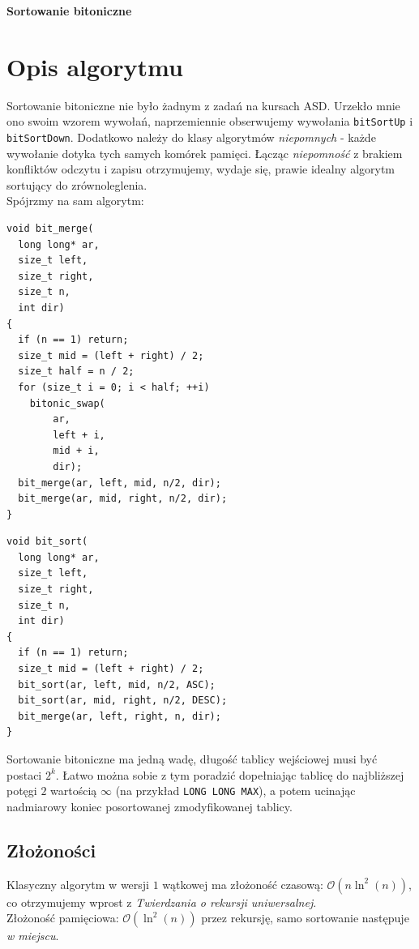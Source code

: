 \documentclass{article}
\begin{document}
\begin{center}
    {\LARGE \textbf{Sortowanie bitoniczne}} \\[1em]
\end{center}

\section*{Opis algorytmu}
Sortowanie bitoniczne nie było żadnym z zadań na kursach ASD. Urzekło mnie ono swoim wzorem wywołań, naprzemiennie obserwujemy wywołania \texttt{bitSortUp} i \texttt{bitSortDown}. Dodatkowo należy do klasy algorytmów \textit{niepomnych} - każde wywołanie dotyka tych samych komórek pamięci. Łącząc \textit{niepomność} z brakiem konfliktów odczytu i zapisu otrzymujemy, wydaje się, prawie idealny algorytm sortujący do zrównoleglenia. \\ 
Spójrzmy na sam algorytm:
\begin{multicols}{2}
\begin{verbatim}
void bit_merge(
  long long* ar,
  size_t left,
  size_t right,
  size_t n,
  int dir)
{
  if (n == 1) return;
  size_t mid = (left + right) / 2;
  size_t half = n / 2;
  for (size_t i = 0; i < half; ++i)
    bitonic_swap(
        ar,
        left + i,
        mid + i,
        dir);
  bit_merge(ar, left, mid, n/2, dir);
  bit_merge(ar, mid, right, n/2, dir);
}
\end{verbatim}
\columnbreak
\begin{verbatim}
void bit_sort(
  long long* ar,
  size_t left,
  size_t right,
  size_t n,
  int dir)
{
  if (n == 1) return;
  size_t mid = (left + right) / 2;
  bit_sort(ar, left, mid, n/2, ASC);
  bit_sort(ar, mid, right, n/2, DESC);
  bit_merge(ar, left, right, n, dir);
}
\end{verbatim}
\end{multicols}
Sortowanie bitoniczne ma jedną wadę, długość tablicy wejściowej musi być postaci $2^k$. Łatwo można sobie z tym poradzić dopełniając tablicę do najbliższej potęgi $2$ wartością $\infty$ (na przykład \texttt{LONG LONG MAX}), a potem ucinając nadmiarowy koniec posortowanej zmodyfikowanej tablicy.
\subsection*{Złożoności}
Klasyczny algorytm w wersji $1$ wątkowej ma złożoność czasową: $\mathcal{O}(n\ln^2(n))$, co otrzymujemy wprost z \textit{Twierdzania o rekursji uniwersalnej}. \\ 
Złożoność pamięciowa: $\mathcal{O}(\ln^2(n))$ przez rekursję, samo sortowanie następuje \textit{w miejscu}.
\end{document}
